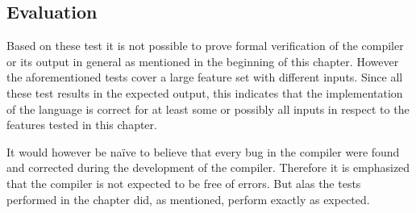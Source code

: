 \subsection*{Evaluation}
Based on these test it is not possible to prove formal verification of the compiler or its output in general as mentioned in the beginning of this chapter.
However the aforementioned tests cover a large feature set with different inputs.
Since all these test results in the expected output, this indicates that the implementation of the language is correct for at least some or possibly all inputs in respect to the features tested in this chapter.

It would however be naïve to believe that every bug in the compiler were found and corrected during the development of the compiler.%
Therefore it is emphasized that the compiler is not expected to be free of errors. %
But alas the tests performed in the chapter did, as mentioned, perform exactly as expected. 